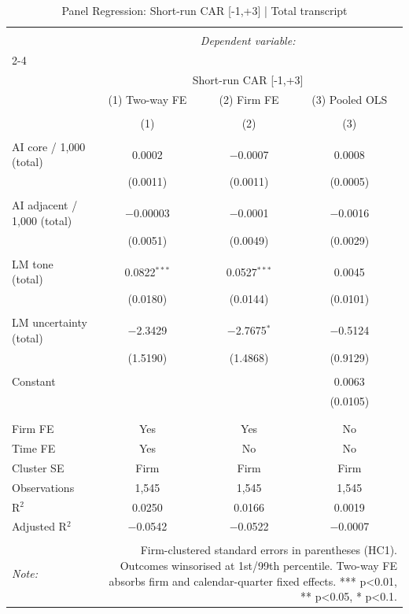 
\begin{table}[!htbp] \centering 
  \caption{Panel Regression: Short-run CAR [-1,+3]  |  Total transcript} 
  \label{} 
\begin{tabular}{@{\extracolsep{5pt}}lccc} 
\\[-1.8ex]\hline 
\hline \\[-1.8ex] 
 & \multicolumn{3}{c}{\textit{Dependent variable:}} \\ 
\cline{2-4} 
\\[-1.8ex] & \multicolumn{3}{c}{Short-run CAR [-1,+3]} \\ 
 & (1) Two-way FE & (2) Firm FE & (3) Pooled OLS \\ 
\\[-1.8ex] & (1) & (2) & (3)\\ 
\hline \\[-1.8ex] 
 AI core / 1,000 (total) & 0.0002 & $-$0.0007 & 0.0008 \\ 
  & (0.0011) & (0.0011) & (0.0005) \\ 
  & & & \\ 
 AI adjacent / 1,000 (total) & $-$0.00003 & $-$0.0001 & $-$0.0016 \\ 
  & (0.0051) & (0.0049) & (0.0029) \\ 
  & & & \\ 
 LM tone (total) & 0.0822$^{***}$ & 0.0527$^{***}$ & 0.0045 \\ 
  & (0.0180) & (0.0144) & (0.0101) \\ 
  & & & \\ 
 LM uncertainty (total) & $-$2.3429 & $-$2.7675$^{*}$ & $-$0.5124 \\ 
  & (1.5190) & (1.4868) & (0.9129) \\ 
  & & & \\ 
 Constant &  &  & 0.0063 \\ 
  &  &  & (0.0105) \\ 
  & & & \\ 
\hline \\[-1.8ex] 
Firm FE & Yes & Yes & No \\ 
Time FE & Yes & No & No \\ 
Cluster SE & Firm & Firm & Firm \\ 
Observations & 1,545 & 1,545 & 1,545 \\ 
R$^{2}$ & 0.0250 & 0.0166 & 0.0019 \\ 
Adjusted R$^{2}$ & $-$0.0542 & $-$0.0522 & $-$0.0007 \\ 
\hline 
\hline \\[-1.8ex] 
\textit{Note:}  & \multicolumn{3}{r}{Firm-clustered standard errors in parentheses (HC1). Outcomes winsorised at 1st/99th percentile. Two-way FE absorbs firm and calendar-quarter fixed effects. *** p<0.01, ** p<0.05, * p<0.1.} \\ 
\end{tabular} 
\end{table} 
